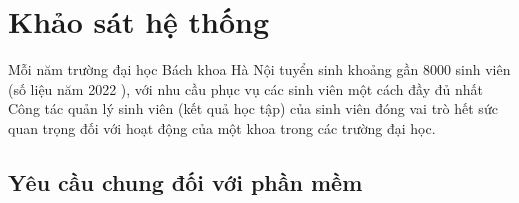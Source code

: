 \chapter{Khảo sát hệ thống}
Mỗi năm trường đại học Bách khoa Hà Nội tuyển sinh khoảng gần 8000 sinh viên (số liệu năm 2022 ), với nhu cầu phục vụ các sinh viên một cách đầy đủ nhất\\
Công tác quản lý sinh viên (kết quả học tập) của sinh viên đóng vai trò hết sức quan trọng đối với hoạt động của một khoa trong các trường đại học.

\section{Yêu cầu chung đối với phần mềm}
